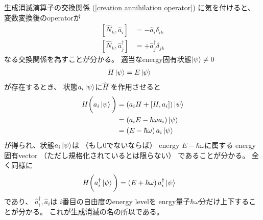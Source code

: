 生成消滅演算子の交換関係
(\ref{creation annihilation operator})
に気を付けると、
変数変換後のoperatorが
\begin{subequations}
\begin{align}
    [\hat{N}_k,\hat{a}_i]
    &= - \hat{a}_i\delta_{ik}
\label{annihilation operator}
\\
    [\hat{N}_k,\hat{a}^\dagger_j]
    &= + \hat{a}^\dagger_j\delta_{jk}
\label{creation operator}
\end{align}
\label{raising and lowering number operator}
\end{subequations}
なる交換関係を為すことが分かる。
適当なenergy固有状態$ \ket{\psi} \neq 0 $
\begin{align}
    H \ket{\psi}
    &=
    E \ket{\psi}
\end{align}
が存在するとき、
状態$a_i \ket{\psi}$に$ \hat{H} $
を作用させると
\begin{align}
    H \bigg(
        a_i \ket{\psi}
    \bigg)
&=
    \left(
        a_i H
    +
        \left[ H, a_i \right]
    \right) \ket{\psi}
\notag\\&=
    \left(
        a_i E
    - \hbar \omega a_i
    \right) \ket{\psi}
\notag\\&=
    \left(
        E - \hbar \omega
    \right)
    a_i \ket{\psi}
\end{align}
が得られ、状態$a_i \ket{\psi}$は
（もし$0$でないならば）
energy $E - \hbar \omega$に属する
energy固有vector
（ただし規格化されているとは限らない）
であることが分かる。
全く同様に
\begin{align}
    H \bigg(
        a^\dagger_i \ket{\psi}
    \bigg)
&=
    \left(
        E + \hbar \omega
    \right)
    a^\dagger_i \ket{\psi}
\end{align}
であり、
$\hat{a}^\dagger_i, \hat{a}_i$は
$i$番目の自由度のenergy levelを
enrgy量子$\hbar\omega$分だけ上下することが分かる。
これが生成消滅の名の所以である。

